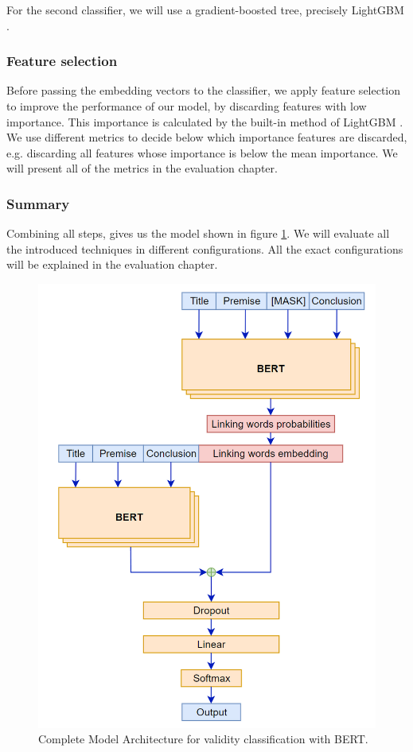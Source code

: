 For the second classifier, we will use a gradient-boosted tree, precisely LightGBM \cite{lgbm}.

\subsubsection{Feature selection}
Before passing the embedding vectors to the classifier, we apply feature selection to improve the performance of our model, by discarding features with low importance. This importance is calculated by the built-in method of LightGBM \cite{lgbmimportance}. We use different metrics to decide below which importance features are discarded, e.g. discarding all features whose importance is below the mean importance. We will present all of the metrics in the evaluation chapter.

\subsubsection{Summary}
Combining all steps, gives us the model shown in figure \ref{fig:model-architecture_full}. We will evaluate all the introduced techniques in different configurations. All the exact configurations will be explained in the evaluation chapter.

\begin{figure}[h]
  \centering
  \includegraphics[scale=0.6]{fig/model_complete.png}
  \caption{Complete Model Architecture for validity classification with BERT.}%
  \label{fig:model-architecture_full}
\end{figure}









